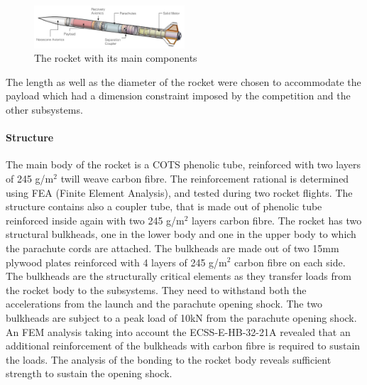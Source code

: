 \begin{figure}[h!]
\centering
\includegraphics[width=0.5\textwidth]{img/rocket_sw_annotated.jpg}
\caption{The rocket with its main components}
\label{f:rocket_adnoted}
\end{figure}


The length as well as the diameter of the rocket were chosen to accommodate the payload which had a dimension constraint imposed by the competition and the other subsystems.





\paragraph{Structure}
\hfill \break
The main body of the rocket is a COTS phenolic tube, reinforced with two layers of 245 g/m$^2$ twill weave carbon fibre. The reinforcement rational is determined using FEA (Finite Element Analysis), and tested during two rocket flights.
The structure contains also a coupler tube, that is made out of phenolic tube reinforced inside again with two 245 g/m$^2$ layers carbon fibre.
The rocket has two structural bulkheads, one in the lower body and one in the upper body to which the parachute cords are attached. The bulkheads are made out of two 15mm plywood plates reinforced with 4 layers of 245 g/m$^2$ carbon fibre on each side.  The bulkheads are the structurally critical elements as they transfer loads from the rocket body to the subsystems. They need to withstand both the accelerations from the launch and the parachute opening shock. 
The two bulkheads are subject to a peak load of 10kN from the parachute opening shock. An FEM analysis taking into account the  ECSS-E-HB-32-21A \cite{ecss} revealed that an additional reinforcement of the bulkheads with carbon fibre is required to sustain the loads. The analysis of the bonding to the rocket body reveals sufficient strength to sustain the opening shock.



